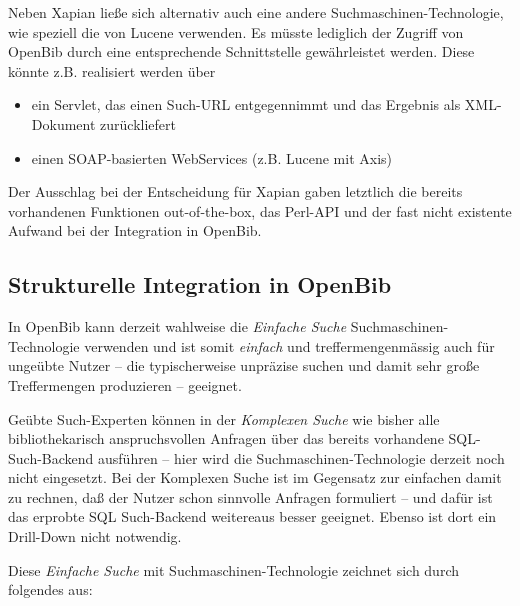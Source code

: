\documentclass[11pt, twoside, a4paper, BCOR8mm, DIV12, bibtotoc,idxtotoc]{scrbook}
\begin{document}
Neben Xapian ließe sich alternativ auch eine andere
Suchmaschinen-Technologie, wie speziell die von Lucene verwenden. Es
müsste lediglich der Zugriff von OpenBib durch eine entsprechende
Schnittstelle gewährleistet werden. Diese könnte z.B. realisiert
werden über

\begin{itemize}
\item ein Servlet, das einen Such-URL entgegennimmt und das Ergebnis
  als XML-Dokument zurückliefert
\item einen SOAP-basierten WebServices (z.B. Lucene mit Axis)
\end{itemize}

Der Ausschlag bei der Entscheidung für Xapian gaben letztlich die
bereits vorhandenen Funktionen out-of-the-box, das Perl-API und der fast nicht
existente Aufwand bei der Integration in OpenBib.

\subsection{Strukturelle Integration in OpenBib}

In OpenBib kann derzeit wahlweise die \emph{Einfache Suche}
Suchmaschinen-Technologie verwenden und ist somit \emph{einfach} und
treffermengenmässig auch für ungeübte Nutzer -- die typischerweise
unpräzise suchen und damit sehr große Treffermengen produzieren --
geeignet.

Geübte Such-Experten können in der \emph{Komplexen Suche} wie bisher alle
bibliothekarisch anspruchs\-vollen Anfragen über das bereits vorhandene
SQL-Such-Backend ausführen -- hier wird die Such\-ma\-schi\-nen-Technologie
derzeit noch nicht eingesetzt.  Bei der Komplexen Suche ist im
Gegen\-satz zur einfachen damit zu rechnen, daß der Nutzer schon
sinnvolle Anfragen formuliert -- und dafür ist das erprobte SQL
Such-Backend weitereaus besser geeignet. Ebenso ist dort ein
Drill-Down nicht notwendig.

Diese \emph{Einfache Suche} mit Such\-maschinen-Technologie zeichnet sich durch
folgendes aus:
\end{document}
